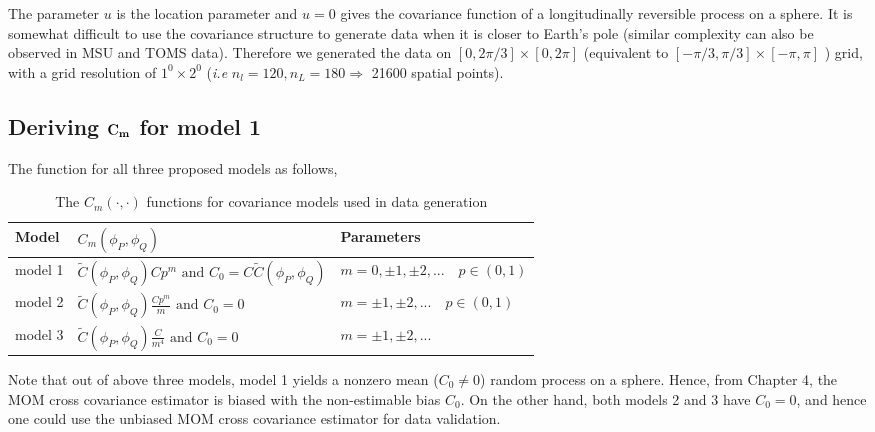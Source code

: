 The parameter $u$ is the location parameter and $u=0$ gives the covariance function of a longitudinally reversible process on a sphere. It is somewhat difficult to use the covariance structure to generate data when it is closer to Earth's pole (similar complexity can also be observed in MSU and TOMS data). Therefore we generated the data on $[0,2\pi/3] \times [0,2\pi]$ (equivalent to $[-\pi/3,\pi/3] \times [-\pi,\pi]$ ) grid, with a grid resolution of $1^0\times 2^0$ ({\em i.e } $n_l = 120, n_L=180 \Rightarrow$ 21600 spatial points). \\

	\subsection{\bf Deriving ${\bf C_m}$ for model 1}
	

The \Cm function for all three proposed models as follows,
				\begin{table}[H]
				\centering
				\begin{tabular}{|l|l|l|}
					\hline
					Model   & $C_m(\phi_P, \phi_Q)$                                         & Parameters                               \\
					\hline \hline
					model 1 & $\tilde{C}(\phi_P, \phi_Q) Cp^m  \mbox{ and } C_0 = C\tilde{C}(\phi_P, \phi_Q)$          & $m=0, \pm 1, \pm 2,... \quad p\in (0,1)$ \\
					model 2 & $\tilde{C}(\phi_P, \phi_Q) \frac{Cp^m}{m} \mbox{ and } C_0 = 0$ & $m=\pm 1, \pm 2,... \quad p\in (0,1)$    \\
					model 3 & $\tilde{C}(\phi_P, \phi_Q) \frac{C}{m^4} \mbox{ and } C_0 = 0$  & $m=\pm 1, \pm 2,...$                     \\
					\hline
				\end{tabular}
				\label{Cm_table}
				\caption[The $C_m(\cdot, \cdot)$ functions for covariance models used in data generation]{The $C_m(\cdot, \cdot)$ functions for covariance models used in data generation}
			\end{table}
	
Note that out of above three models, model 1 yields a nonzero mean ($C_0 \ne 0$) random process on a sphere. Hence, from Chapter 4, the MOM cross covariance estimator is biased with the non-estimable bias $C_0$. On the other hand, both models 2 and 3 have $C_0 = 0$, and hence one could use the unbiased MOM cross covariance estimator for data validation. \\

